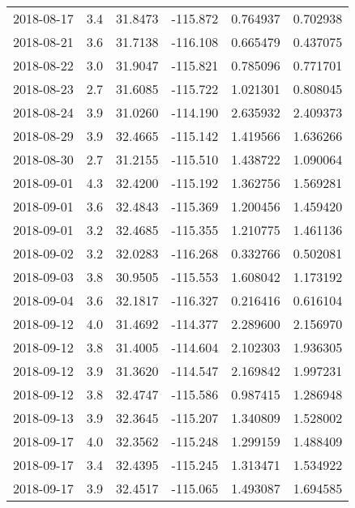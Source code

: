 \begin{tabular}{lrrrrr}
2018-08-17 &       3.4 &  31.8473 &  -115.872 &         0.764937 &         0.702938 \\
2018-08-21 &       3.6 &  31.7138 &  -116.108 &         0.665479 &         0.437075 \\
2018-08-22 &       3.0 &  31.9047 &  -115.821 &         0.785096 &         0.771701 \\
2018-08-23 &       2.7 &  31.6085 &  -115.722 &         1.021301 &         0.808045 \\
2018-08-24 &       3.9 &  31.0260 &  -114.190 &         2.635932 &         2.409373 \\
2018-08-29 &       3.9 &  32.4665 &  -115.142 &         1.419566 &         1.636266 \\
2018-08-30 &       2.7 &  31.2155 &  -115.510 &         1.438722 &         1.090064 \\
2018-09-01 &       4.3 &  32.4200 &  -115.192 &         1.362756 &         1.569281 \\
2018-09-01 &       3.6 &  32.4843 &  -115.369 &         1.200456 &         1.459420 \\
2018-09-01 &       3.2 &  32.4685 &  -115.355 &         1.210775 &         1.461136 \\
2018-09-02 &       3.2 &  32.0283 &  -116.268 &         0.332766 &         0.502081 \\
2018-09-03 &       3.8 &  30.9505 &  -115.553 &         1.608042 &         1.173192 \\
2018-09-04 &       3.6 &  32.1817 &  -116.327 &         0.216416 &         0.616104 \\
2018-09-12 &       4.0 &  31.4692 &  -114.377 &         2.289600 &         2.156970 \\
2018-09-12 &       3.8 &  31.4005 &  -114.604 &         2.102303 &         1.936305 \\
2018-09-12 &       3.9 &  31.3620 &  -114.547 &         2.169842 &         1.997231 \\
2018-09-12 &       3.8 &  32.4747 &  -115.586 &         0.987415 &         1.286948 \\
2018-09-13 &       3.9 &  32.3645 &  -115.207 &         1.340809 &         1.528002 \\
2018-09-17 &       4.0 &  32.3562 &  -115.248 &         1.299159 &         1.488409 \\
2018-09-17 &       3.4 &  32.4395 &  -115.245 &         1.313471 &         1.534922 \\
2018-09-17 &       3.9 &  32.4517 &  -115.065 &         1.493087 &         1.694585 \\

\end{tabular}

